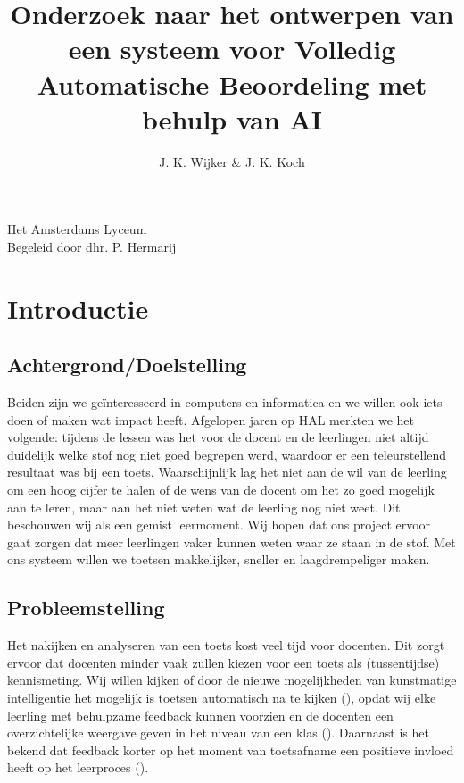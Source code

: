 \documentclass[12pt]{article}
\title{Onderzoek naar het ontwerpen van een systeem voor Volledig Automatische Beoordeling met behulp van AI}
\author{J. K. Wijker \& J. K. Koch}
\begin{document}
\maketitle
\mbox{}
\vfill
\begin{flushright}
\large Het Amsterdams Lyceum\\
\scriptsize Begeleid door dhr. P. Hermarij \normalsize
\end{flushright}
\thispagestyle{empty}
\pagebreak

{\footnotesize\tableofcontents \normalsize}

\pagebreak
\section{Introductie}
\begin{multicols}{2}
\subsection{Achtergrond/Doelstelling} 

Beiden zijn we geïnteresseerd in computers en informatica en we willen ook iets doen of maken wat impact heeft. Afgelopen jaren op HAL merkten we het volgende: tijdens de lessen was het voor de docent en de leerlingen niet altijd duidelijk welke stof nog niet goed begrepen werd, waardoor er een teleurstellend resultaat was bij een toets. Waarschijnlijk lag het niet aan de wil van de leerling om een hoog cijfer te halen of de wens van de docent om het zo goed mogelijk aan te leren, maar aan het niet weten wat de leerling nog niet weet. Dit beschouwen wij als een gemist leermoment. Wij hopen dat ons project ervoor gaat zorgen dat meer leerlingen vaker kunnen weten waar ze staan in de stof. Met ons systeem willen we toetsen makkelijker, sneller en laagdrempeliger maken.


\subsection{Probleemstelling}

Het nakijken en analyseren van een toets kost veel tijd voor docenten. Dit zorgt ervoor dat docenten minder vaak zullen kiezen voor een toets als (tussentijdse) kennismeting. Wij willen kijken of door de nieuwe mogelijkheden van kunstmatige intelligentie het mogelijk is toetsen automatisch na te kijken (\cite{mdpiAIinEducation}), opdat wij elke leerling met behulpzame feedback kunnen voorzien en de docenten een overzichtelijke weergave geven in het niveau van een klas (\cite{YEUNG2023EVA}). Daarnaast is het bekend dat feedback korter op het moment van toetsafname een positieve invloed heeft op het leerproces (\cite{powerFeedback}). 


\end{multicols}
\end{document}
